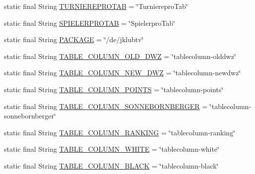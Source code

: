 \begin{DoxyCompactItemize}
\item 
static final String \hyperlink{classde_1_1turnierverwaltung_1_1control_1_1_properties_control_af70f5c6ad4884fc2394a4970b9e2cd50}{T\+U\+R\+N\+I\+E\+R\+E\+P\+R\+O\+T\+AB} = \char`\"{}Turnierepro\+Tab\char`\"{}
\item 
static final String \hyperlink{classde_1_1turnierverwaltung_1_1control_1_1_properties_control_a7aac3eeaada66d7f719b5bf02979d05f}{S\+P\+I\+E\+L\+E\+R\+P\+R\+O\+T\+AB} = \char`\"{}Spielerpro\+Tab\char`\"{}
\item 
static final String \hyperlink{classde_1_1turnierverwaltung_1_1control_1_1_properties_control_a95a4fb66bba1453b75b72a2c47357079}{P\+A\+C\+K\+A\+GE} = \char`\"{}/de/jklubtv\char`\"{}
\item 
static final String \hyperlink{classde_1_1turnierverwaltung_1_1control_1_1_properties_control_af80a1116cdb97831927074f6c217d289}{T\+A\+B\+L\+E\+\_\+\+C\+O\+L\+U\+M\+N\+\_\+\+O\+L\+D\+\_\+\+D\+WZ} = \char`\"{}tablecolumn-\/olddwz\char`\"{}
\item 
static final String \hyperlink{classde_1_1turnierverwaltung_1_1control_1_1_properties_control_a69fe36ef236fd95fe4745fe1969ba4fe}{T\+A\+B\+L\+E\+\_\+\+C\+O\+L\+U\+M\+N\+\_\+\+N\+E\+W\+\_\+\+D\+WZ} = \char`\"{}tablecolumn-\/newdwz\char`\"{}
\item 
static final String \hyperlink{classde_1_1turnierverwaltung_1_1control_1_1_properties_control_add31f5c87d504b996c6e56d91aea8ea4}{T\+A\+B\+L\+E\+\_\+\+C\+O\+L\+U\+M\+N\+\_\+\+P\+O\+I\+N\+TS} = \char`\"{}tablecolumn-\/points\char`\"{}
\item 
static final String \hyperlink{classde_1_1turnierverwaltung_1_1control_1_1_properties_control_a5479e2af37e260939a7b292fc7ad8263}{T\+A\+B\+L\+E\+\_\+\+C\+O\+L\+U\+M\+N\+\_\+\+S\+O\+N\+N\+E\+B\+O\+R\+N\+B\+E\+R\+G\+ER} = \char`\"{}tablecolumn-\/sonnebornberger\char`\"{}
\item 
static final String \hyperlink{classde_1_1turnierverwaltung_1_1control_1_1_properties_control_a9943378a80957f3ac86ca09e8afcb017}{T\+A\+B\+L\+E\+\_\+\+C\+O\+L\+U\+M\+N\+\_\+\+R\+A\+N\+K\+I\+NG} = \char`\"{}tablecolumn-\/ranking\char`\"{}
\item 
static final String \hyperlink{classde_1_1turnierverwaltung_1_1control_1_1_properties_control_ac6301dcbfaf53306035646967b403441}{T\+A\+B\+L\+E\+\_\+\+C\+O\+L\+U\+M\+N\+\_\+\+W\+H\+I\+TE} = \char`\"{}tablecolumn-\/white\char`\"{}
\item 
static final String \hyperlink{classde_1_1turnierverwaltung_1_1control_1_1_properties_control_a62a38e0e5dfa4df21befea01095d1e3e}{T\+A\+B\+L\+E\+\_\+\+C\+O\+L\+U\+M\+N\+\_\+\+B\+L\+A\+CK} = \char`\"{}tablecolumn-\/black\char`\"{}

\end{DoxyCompactItemize}
